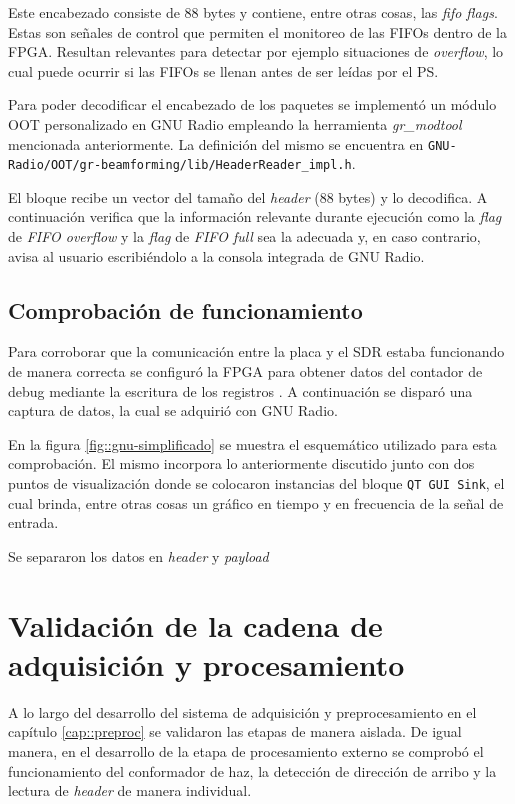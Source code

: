\documentclass[../../main.tex]{subfiles}
\begin{document}
Este encabezado consiste de 88 bytes y contiene, entre otras cosas, las \textit{fifo flags}. Estas son señales de control que permiten el monitoreo de las FIFOs dentro de la FPGA. Resultan relevantes para detectar por ejemplo situaciones de \textit{overflow}, lo cual puede ocurrir si las FIFOs se llenan antes de ser leídas por el PS.

Para poder decodificar el encabezado de los paquetes se implementó un módulo OOT personalizado en GNU Radio empleando la herramienta \textit{gr\_modtool} mencionada anteriormente. La definición del mismo se encuentra en \texttt{GNU-Radio/OOT/gr-beamforming/lib/HeaderReader\_impl.h}. 

El bloque recibe un vector del tamaño del \textit{header} (88 bytes) y lo decodifica. A continuación verifica que la información relevante durante ejecución como la \textit{flag} de \textit{FIFO overflow} y la \textit{flag} de \textit{FIFO full} sea la adecuada y, en caso contrario, avisa al usuario escribiéndolo a la consola integrada de GNU Radio.


\subsection{Comprobación de funcionamiento}
Para corroborar que la comunicación entre la placa y el SDR estaba funcionando de manera correcta se configuró la FPGA para obtener datos del contador de debug mediante la escritura de los registros . A continuación se disparó una captura de datos, la cual se adquirió con GNU Radio.

En la figura \ref{fig::gnu-simplificado} se muestra el esquemático utilizado para esta comprobación. El mismo incorpora lo anteriormente discutido junto con dos puntos de visualización donde se colocaron instancias del bloque \texttt{QT GUI Sink}, el cual brinda, entre otras cosas un gráfico en tiempo y en frecuencia de la señal de entrada.

Se separaron los datos en \textit{header} y \textit{payload} 


\section{Validación de la cadena de adquisición y procesamiento}
A lo largo del desarrollo del sistema de adquisición y preprocesamiento en el capítulo \ref{cap::preproc} se validaron las etapas de manera aislada. De igual manera, en el desarrollo de la etapa de procesamiento externo se comprobó el funcionamiento del conformador de haz, la detección de dirección de arribo y la lectura de \textit{header} de manera individual.
\end{document}

